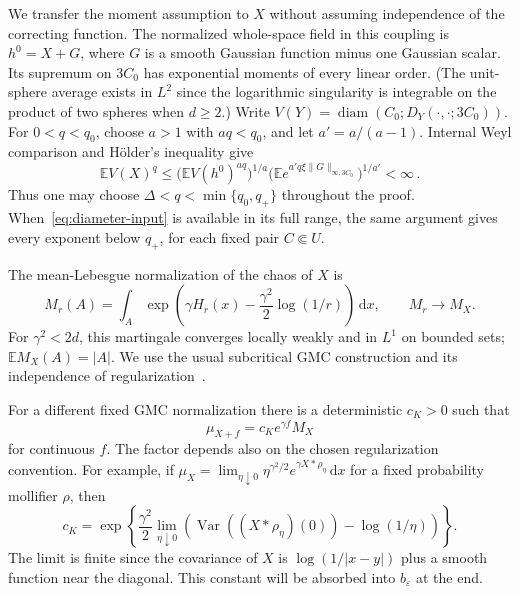 \documentclass[11pt,letterpaper]{article}
\newcommand{\E}{\mathbb E}
\newcommand{\eps}{\varepsilon}
\newcommand{\dd}{\,\mathrm d}
\DeclareMathOperator{\diam}{diam}
\DeclareMathOperator{\Var}{Var}
\theoremstyle{definition}
\theoremstyle{remark}
\numberwithin{equation}{section}
\begin{document}
We transfer the moment assumption to $X$ without assuming independence of the correcting function. The normalized whole-space field in this coupling is $h^0=X+G$, where $G$ is a smooth Gaussian function minus one Gaussian scalar. Its supremum on $3C_0$ has exponential moments of every linear order. (The unit-sphere average exists in $L^2$ since the logarithmic singularity is integrable on the product of two spheres when $d\ge2$.) Write $V(Y)=\diam(C_0;D_Y(\cdot,\cdot;3C_0))$. For $0<q<q_0$, choose $a>1$ with $aq<q_0$, and let $a'=a/(a-1)$. Internal Weyl comparison and H\"older's inequality give
\begin{equation}\label{eq:cutoff-diameter}
 \E V(X)^q
 \le \bigl(\E V(h^0)^{aq}\bigr)^{1/a}
      \bigl(\E e^{a'q\xi\|G\|_{\infty,3C_0}}\bigr)^{1/a'}
 <\infty\,.
\end{equation}
Thus one may choose $\Delta<q<\min\{q_0,q_+\}$ throughout the proof. When~\eqref{eq:diameter-input} is available in its full range, the same argument gives every exponent below $q_+$, for each fixed pair $C\Subset U$.

The mean-Lebesgue normalization of the chaos of $X$ is
\begin{equation}\label{eq:cutoff-chaos}
 M_r(A)=\int_A
   \exp\!\left(\gamma H_r(x)-\frac{\gamma^2}{2}\log(1/r)\right)\dd x,
 \qquad M_r\longrightarrow M_X.
\end{equation}
For $\gamma^2<2d$, this martingale converges locally weakly and in $L^1$ on bounded sets; $\E M_X(A)=|A|$. We use the usual subcritical GMC construction and its independence of regularization~\cite{RV,Shamov}.

For a different fixed GMC normalization there is a deterministic $c_K>0$ such that
\begin{equation}\label{eq:normalization-factor}
 \mu_{X+f}=c_K e^{\gamma f}M_X
\end{equation}
for continuous $f$. The factor depends also on the chosen regularization convention. For example, if $\mu_X=\lim_{\eta\downarrow0}\eta^{\gamma^2/2}e^{\gamma X*\rho_\eta}\dd x$ for a fixed probability mollifier $\rho$, then
\begin{equation*}
 c_K=\exp\!\left\{\frac{\gamma^2}{2}
   \lim_{\eta\downarrow0}
       \left(\Var((X*\rho_\eta)(0))-\log(1/\eta)\right)\right\}.
\end{equation*}
The limit is finite since the covariance of $X$ is $\log(1/|x-y|)$ plus a smooth function near the diagonal. This constant will be absorbed into $b_\eps$ at the end.
\end{document}
